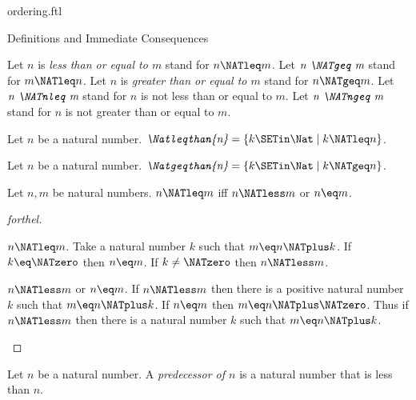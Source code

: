 \documentclass{naproche-library}
\begin{document}
\begin{smodule}[title=The Standard Ordering of the Natural Numbers]{ordering.ftl}
\begin{sfragment}{Definitions and Immediate Consequences}
\begin{definition}[forthel,id=ARITHMETIC_04_4593841531256832]
    Let $n$ is \emph{less than or equal to $m$} stand for $n \NATleq m$.
    Let $\emph{n \NATgeq m}$ stand for $m \NATleq n$.
    Let $n$ is \emph{greater than or equal to $m$} stand for $n \NATgeq m$.
    Let $\emph{n \NATnleq m}$ stand for $n$ is not less than or equal to $m$.
    Let $\emph{n \NATngeq m}$ stand for $n$ is not greater than or equal to $m$.
  \end{definition}

  \begin{definition}[forthel,id=ARITHMETIC_04_72501526790144]
    Let $n$ be a natural number.
    $\emph{\Natleqthan{n}} = \{ k \SETin \Nat \mid k \NATleq n \}$.
  \end{definition}

  \begin{definition}[forthel,id=ARITHMETIC_04_1706933421604864]
    Let $n$ be a natural number.
    $\emph{\Natgeqthan{n}} = \{ k \SETin \Nat \mid k \NATgeq n \}$.
  \end{definition}

  \begin{proposition}[forthel,id=ARITHMETIC_04_5385415374667776]
    Let $n, m$ be natural numbers.
    $n \NATleq m$ iff $n \NATless m$ or $n \eq m$.
  \end{proposition}
  \begin{proof}[forthel]
    \begin{case}{$n \NATleq m$.}
      Take a natural number $k$ such that $m \eq n \NATplus k$.
      If $k \eq \NATzero$ then $n \eq m$. If $k \neq \NATzero$ then $n \NATless m$.
    \end{case}

    \begin{case}{$n \NATless m$ or $n \eq m$.}
      If $n \NATless m$ then there is a positive natural number $k$ such that $m \eq n \NATplus k$.
      If $n \eq m$ then $m \eq n \NATplus \NATzero$.
      Thus if $n \NATless m$ then there is a natural number $k$ such that $m \eq n \NATplus k$.
    \end{case}
  \end{proof}


  \begin{definition}[forthel,id=ARITHMETIC_04_6232154608500736]
    Let $n$ be a natural number.
    A \emph{predecessor of $n$} is a natural number that is less than $n$.
  \end{definition}



\end{sfragment}
\end{smodule}
\end{document}
